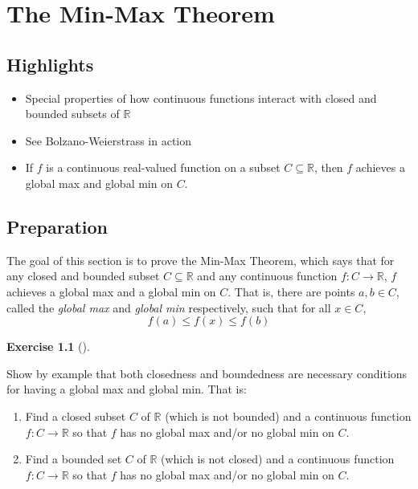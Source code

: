 \documentclass[
  letterpaper,
  DIV=11,
  numbers=noendperiod]{scrreprt}
\providecommand{\tightlist}{%
  \setlength{\itemsep}{0pt}\setlength{\parskip}{0pt}}
\def\R{\mathbb R}
\theoremstyle{plain}
\theoremstyle{definition}
\newtheorem{exercise}{Exercise}[chapter]
\theoremstyle{plain}
\theoremstyle{plain}
\theoremstyle{definition}
\theoremstyle{definition}
\theoremstyle{remark}
\begin{document}

\chapter{The Min-Max Theorem}\label{the-min-max-theorem}

\section{Highlights}\label{highlights-10}

\begin{itemize}
\tightlist
\item
  Special properties of how continuous functions interact with closed
  and bounded subsets of \(\R\)
\item
  See Bolzano-Weierstrass in action
\item
  If \(f\) is a continuous real-valued function on a subset
  \(C\subseteq\R\), then \(f\) achieves a global max and global min on
  \(C\).
\end{itemize}

\section{Preparation}\label{preparation-10}

The goal of this section is to prove the Min-Max Theorem, which says
that for any closed and bounded subset \(C\subseteq\mathbb R\) and any
continuous function \(f:C\rightarrow\mathbb R\), \(f\) achieves a global
max and a global min on \(C\). That is, there are points \(a,b\in C\),
called the \emph{global max} and \emph{global min} respectively, such
that for all \(x\in C\), \[f(a)\leq f(x)\leq f(b)\]

\begin{exercise}[]\protect\hypertarget{exr-necessity-of-compactness}{}\label{exr-necessity-of-compactness}

Show by example that both closedness and boundedness are necessary
conditions for having a global max and global min. That is:

\begin{enumerate}
\def\labelenumi{\arabic{enumi}.}
\tightlist
\item
  Find a closed subset \(C\) of \(\mathbb R\) (which is not bounded) and
  a continuous function \(f:C\rightarrow\mathbb R\) so that \(f\) has no
  global max and/or no global min on \(C\).
\item
  Find a bounded set \(C\) of \(\mathbb R\) (which is not closed) and a
  continuous function \(f:C\rightarrow\mathbb R\) so that \(f\) has no
  global max and/or no global min on \(C\).
\end{enumerate}

\end{exercise}
\end{document}
